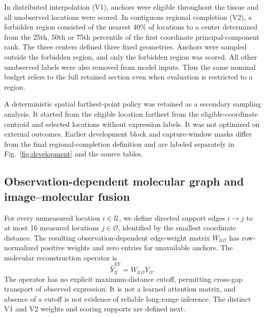 In distributed interpolation (V1), anchors were eligible throughout the tissue and all unobserved locations were scored. In contiguous regional completion (V2), a forbidden region consisted of the nearest 40\% of locations to a center determined from the 25th, 50th or 75th percentile of the first coordinate principal-component rank. The three centers defined three fixed geometries. Anchors were sampled outside the forbidden region, and only the forbidden region was scored. All other unobserved labels were also removed from model inputs. Thus the same nominal budget refers to the full retained section even when evaluation is restricted to a region.

A deterministic spatial farthest-point policy was retained as a secondary sampling analysis. It started from the eligible location farthest from the eligible-coordinate centroid and selected locations without expression labels. It was not optimized on external outcomes. Earlier development block and capture-window masks differ from the final regional-completion definition and are labeled separately in Fig.~\ref{fig:development} and the source tables.

\subsection{Observation-dependent molecular graph and image--molecular fusion}
For every unmeasured location $i\in\mathcal U$, we define directed support edges $i\rightarrow j$ to at most 16 measured locations $j\in\mathcal O$, identified by the smallest coordinate distance. The resulting observation-dependent edge-weight matrix $W_{\mathcal U\mathcal O}$ has row-normalized positive weights and zero entries for unavailable anchors. The molecular reconstruction operator is
\begin{equation}
\widehat{Y}^{\mathrm{ST}}_{\mathcal U}=W_{\mathcal U\mathcal O}Y_{\mathcal O}.
\label{eq:molecular_graph}
\end{equation}
The operator has no explicit maximum-distance cutoff, permitting cross-gap transport of observed expression. It is not a learned attention matrix, and absence of a cutoff is not evidence of reliable long-range inference. The distinct V1 and V2 weights and scoring supports are defined next.

